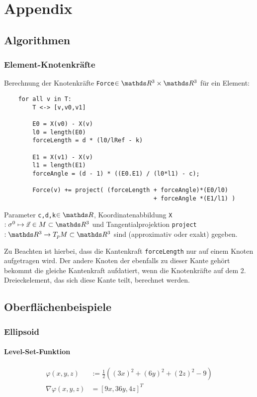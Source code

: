 \chapter{Appendix}

\section{Algorithmen}
  
  
  \subsection{Element-Knotenkräfte}
    \label{AlgoForces}
    Berechnung der Knotenkräfte \texttt{Force}\( \in\R^{3}\times\R^{3} \) für ein Element:

    \begin{verbatim}
    for all v in T:
        T <-> [v,v0,v1]
        
        E0 = X(v0) - X(v)
        l0 = length(E0)
        forceLength = d * (l0/lRef - k)

        E1 = X(v1) - X(v)
        l1 = length(E1)
        forceAngle = (d - 1) * ((E0.E1) / (l0*l1) - c);

        Force(v) += project( (forceLength + forceAngle)*(E0/l0) 
                                          + forceAngle *(E1/l1) ) 
    \end{verbatim}

    Parameter \texttt{c,d,k}\( \in\R \), 
    Koordinatenabbildung \texttt{X}\(: \sigma^{0} \mapsto \vec{x}\in M \subset \R^{3} \) 
    und Tangentialprojektion \texttt{project}\(: \R^{3} \rightarrow T_{p}M \subset \R^{3} \)
    sind (approximativ oder exakt) gegeben.

    Zu Beachten ist hierbei, dass die Kantenkraft \texttt{forceLength} nur auf einem Knoten aufgetragen wird.
    Der andere Knoten der ebenfalls zu dieser Kante gehört bekommt die gleiche Kantenkraft aufdatiert, wenn die Knotenkräfte auf dem 2. Dreieckelement, das sich diese Kante teilt, berechnet
    werden.


\section{Oberflächenbeispiele}

  \subsection{Ellipsoid}
    \label{heineC}
    
    \subsubsection{Level-Set-Funktion}
      \begin{align}
        \varphi(x,y,z) &:= \frac{1}{2}\left( (3x)^{2} + (6y)^{2} + (2z)^{2} - 9 \right) \\
        \nabla\varphi(x,y,z) &= \left[ 9x, 36y, 4z \right]^{T}
      \end{align}
